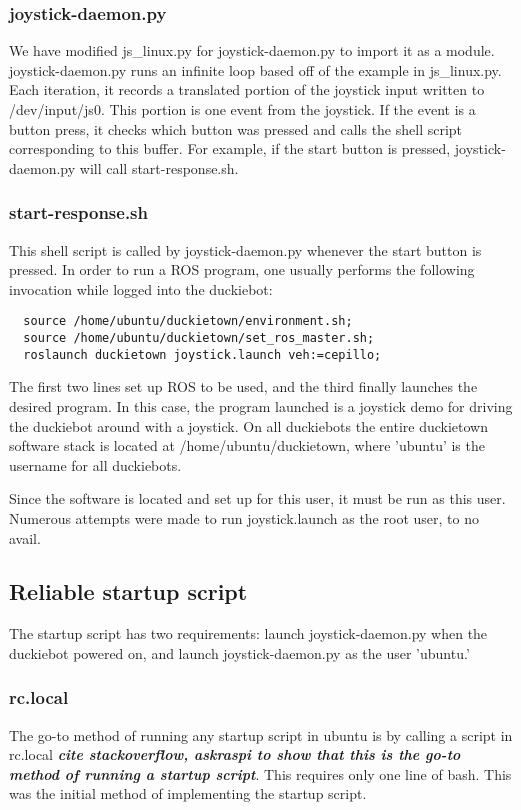 \documentclass[titlepage]{article}
\begin{document}
\subsubsection{joystick-daemon.py}
We have modified js\_linux.py for joystick-daemon.py to import it as a module. joystick-daemon.py runs an infinite loop based off of the example in js\_linux.py. Each iteration, it records a translated portion of the joystick input written to /dev/input/js0. This portion is one event from the joystick. If the event is a button press, it checks which button was pressed and calls the shell script corresponding to this buffer. For example, if the start button is pressed, joystick-daemon.py will call start-response.sh.
\subsubsection{start-response.sh}
This shell script is called by joystick-daemon.py whenever the start button is pressed. In order to run a ROS program, one usually performs the following invocation while logged into the duckiebot:

\begin{lstlisting}
  source /home/ubuntu/duckietown/environment.sh;
  source /home/ubuntu/duckietown/set_ros_master.sh;
  roslaunch duckietown joystick.launch veh:=cepillo;
\end{lstlisting}

The first two lines set up ROS to be used, and the third finally launches the desired program. 
In this case, the program launched is a joystick demo for driving the duckiebot around with a joystick. 
On all duckiebots the entire duckietown software stack is located at /home/ubuntu/duckietown, where 'ubuntu' is the username for all duckiebots. 

Since the software is located and set up for this user, it must be run as this user. Numerous attempts were made to run joystick.launch as the root user, to no avail. 
\subsection{Reliable startup script} %
The startup script has two requirements: launch joystick-daemon.py when the duckiebot powered on, and launch joystick-daemon.py as the user 'ubuntu.'
\subsubsection{rc.local}
The go-to method of running any startup script in ubuntu is by calling a script in rc.local \textbf{\textit{cite stackoverflow, askraspi to show that this is the go-to method of running a startup script}}. This requires only one line of bash. This was the initial method of implementing the startup script. 
\end{document}
